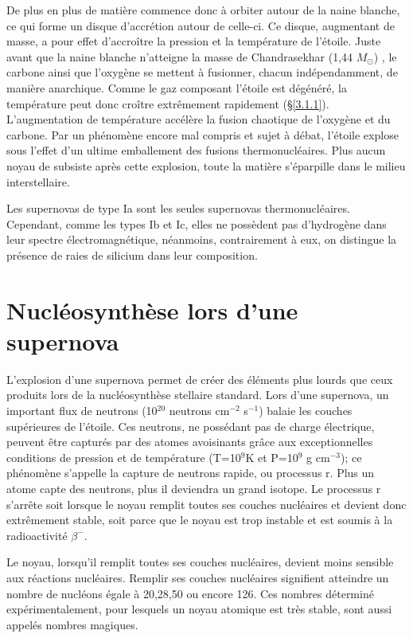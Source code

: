 De plus en plus de matière commence donc à orbiter autour de la naine blanche, ce qui forme un disque d'accrétion autour de celle-ci. Ce disque, augmentant de masse, a pour effet d'accroître la pression et la température de l'étoile. Juste avant que la naine blanche n'atteigne la masse de Chandrasekhar (1,44 $M_\odot$) 
 , le carbone ainsi que l'oxygène se mettent à fusionner, chacun indépendamment, de manière anarchique. Comme le gaz composant l'étoile est dégénéré, la température peut donc croître extrêmement rapidement (§\ref{3.1.1}). L'augmentation de température accélère la fusion chaotique de l'oxygène et du carbone. Par un phénomène encore mal compris et sujet à débat, l'étoile explose sous l'effet d'un ultime emballement des fusions thermonucléaires. Plus aucun noyau de subsiste après cette explosion, toute la matière s'éparpille dans le milieu interstellaire.\smallskip
 
 Les supernovas de type Ia sont les seules supernovas thermonucléaires. Cependant, comme les types Ib et Ic, elles ne possèdent pas d'hydrogène dans leur spectre électromagnétique, néanmoins, contrairement à eux, on distingue la présence de raies de silicium dans leur composition. 
 
 \section{Nucléosynthèse lors d'une supernova}\label{3.2} 
 
 L'explosion d'une supernova permet de créer des éléments plus lourds que ceux produits lors de la nucléosynthèse stellaire standard. Lors d'une supernova, un important flux de neutrons (10$^{20}$ neutrons cm$^{-2}$ s$^{-1}$) balaie les couches supérieures de l'étoile. Ces neutrons, ne possédant pas de charge électrique, peuvent être capturés par des atomes avoisinants grâce aux exceptionnelles conditions de pression et de température (T=10$^{9}$K et P=10$^{9}$ g cm$^{-3}$); ce phénomène s'appelle la capture de neutrons rapide, ou processus r\footnotemark[2]. 
 Plus un atome capte des neutrons, plus il deviendra un grand isotope. Le processus r s'arrête soit lorsque le noyau remplit toutes ses couches nucléaires et devient donc extrêmement stable, soit parce que le noyau est trop instable et est soumis à la radioactivité $\beta^{-}$.\smallskip
 
 Le noyau, lorsqu'il remplit toutes ses couches nucléaires, devient moins sensible aux réactions nucléaires. Remplir ses couches nucléaires signifient atteindre un nombre de nucléons égale à 20,28,50 ou encore 126. Ces nombres déterminé expérimentalement, pour lesquels un noyau atomique est très stable, sont aussi appelés nombres magiques.\smallskip 
 
